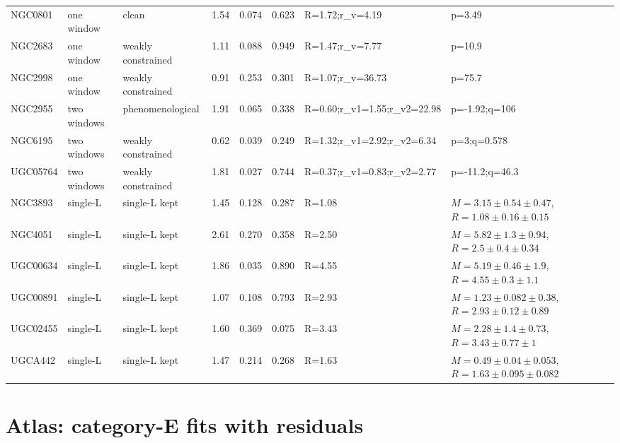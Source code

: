\documentclass[10pt]{article}
\begin{document}
\begin{landscape}
{\begin{longtable}{lllrrrll}
NGC0801 & one window & clean & 1.54 & 0.074 & 0.623 & R=1.72;r\_v=4.19 & p=3.49\\
NGC2683 & one window & weakly constrained & 1.11 & 0.088 & 0.949 & R=1.47;r\_v=7.77 & p=10.9\\
NGC2998 & one window & weakly constrained & 0.91 & 0.253 & 0.301 & R=1.07;r\_v=36.73 & p=75.7\\
NGC2955 & two windows & phenomenological & 1.91 & 0.065 & 0.338 & R=0.60;r\_v1=1.55;r\_v2=22.98 & p=-1.92;q=106\\
NGC6195 & two windows & weakly constrained & 0.62 & 0.039 & 0.249 & R=1.32;r\_v1=2.92;r\_v2=6.34 & p=3;q=0.578\\
UGC05764 & two windows & weakly constrained & 1.81 & 0.027 & 0.744 & R=0.37;r\_v1=0.83;r\_v2=2.77 & p=-11.2;q=46.3\\
NGC3893 & single-L & single-L kept & 1.45 & 0.128 & 0.287 & R=1.08 & $M=3.15\pm0.54\pm0.47$, $R=1.08\pm0.16\pm0.15$\\
NGC4051 & single-L & single-L kept & 2.61 & 0.270 & 0.358 & R=2.50 & $M=5.82\pm1.3\pm0.94$, $R=2.5\pm0.4\pm0.34$\\
UGC00634 & single-L & single-L kept & 1.86 & 0.035 & 0.890 & R=4.55 & $M=5.19\pm0.46\pm1.9$, $R=4.55\pm0.3\pm1.1$\\
UGC00891 & single-L & single-L kept & 1.07 & 0.108 & 0.793 & R=2.93 & $M=1.23\pm0.082\pm0.38$, $R=2.93\pm0.12\pm0.89$\\
UGC02455 & single-L & single-L kept & 1.60 & 0.369 & 0.075 & R=3.43 & $M=2.28\pm1.4\pm0.73$, $R=3.43\pm0.77\pm1$\\
UGCA442 & single-L & single-L kept & 1.47 & 0.214 & 0.268 & R=1.63 & $M=0.49\pm0.04\pm0.053$, $R=1.63\pm0.095\pm0.082$\\
\end{longtable}}\end{landscape}
\section*{Atlas: category-E fits with residuals}
\end{document}
